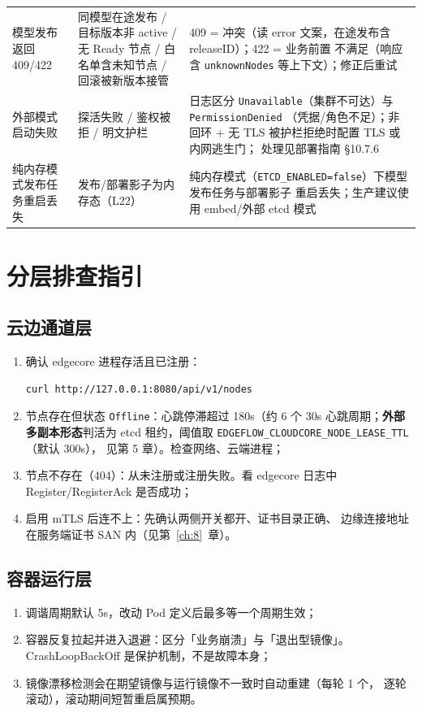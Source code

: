 \begin{table}[htbp]
\begin{tabularx}{\textwidth}{l l X}
模型发布返回 409/422 & 同模型在途发布 / 目标版本非 active /
无 Ready 节点 / 白名单含未知节点 / 回滚被新版本接管 &
409 = 冲突（读 error 文案，在途发布含 releaseID）；422 = 业务前置
不满足（响应含 \texttt{unknownNodes} 等上下文）；修正后重试 \\
外部模式启动失败 & 探活失败 / 鉴权被拒 / 明文护栏 &
日志区分 \texttt{Unavailable}（集群不可达）与 \texttt{PermissionDenied}
（凭据/角色不足）；非回环 + 无 TLS 被护栏拒绝时配置 TLS 或内网逃生门；
处理见部署指南 §10.7.6 \\
纯内存模式发布任务重启丢失 & 发布/部署影子为内存态（L22） &
纯内存模式（\texttt{ETCD\_ENABLED=false}）下模型发布任务与部署影子
重启丢失；生产建议使用 embed/外部 etcd 模式 \\
\bottomrule
\end{tabularx}
\end{table}

\section{分层排查指引}

\subsection{云边通道层}

\begin{enumerate}
  \item 确认 edgecore 进程存活且已注册：
\begin{lstlisting}
curl http://127.0.0.1:8080/api/v1/nodes
\end{lstlisting}
  \item 节点存在但状态 \texttt{Offline}：心跳停滞超过 180s（约 6 个
        30s 心跳周期；\textbf{外部多副本形态}判活为 etcd 租约，阈值取
        \texttt{EDGEFLOW\_CLOUDCORE\_NODE\_LEASE\_TTL}（默认 300s），
        见第 5 章）。检查网络、云端进程；
  \item 节点不存在（404）：从未注册或注册失败。看 edgecore 日志中
        Register/RegisterAck 是否成功；
  \item 启用 mTLS 后连不上：先确认两侧开关都开、证书目录正确、
        边缘连接地址在服务端证书 SAN 内（见第~\ref{ch:8}~章）。
\end{enumerate}

\subsection{容器运行层}

\begin{enumerate}
  \item 调谐周期默认 5s，改动 Pod 定义后最多等一个周期生效；
  \item 容器反复拉起并进入退避：区分「业务崩溃」与「退出型镜像」。
        CrashLoopBackOff 是保护机制，不是故障本身；
  \item 镜像漂移检测会在期望镜像与运行镜像不一致时自动重建（每轮 1 个，
        逐轮滚动），滚动期间短暂重启属预期。
\end{enumerate}

